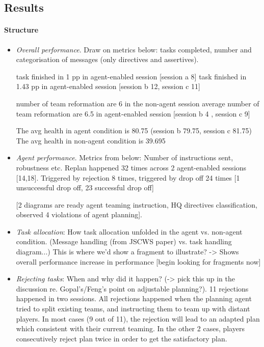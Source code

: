 \subsection{Results}

\paragraph{Structure}
\begin{itemize}
\item  \textit{Overall performance}. Draw on metrics below: tasks completed, number and categorisation of messages (only directives and assertives).


task finished in 1 pp in agent-enabled session [session a 8] 
task finished in 1.43 pp in agent-enabled session [session b 12, session c 11]

number of team reformation are 6 in the non-agent session 
average number of team reformation are 6.5 in agent-enabled session [session b 4 , session c 9]

The avg health in agent condition is 80.75 (session b 79.75, session c 81.75)
The avg health in non-agent condition is 39.695

\item \textit{Agent performance}. Metrics from below: Number of instructions sent, robustness etc. 
Replan happened 32 times across 2 agent-enabled sessions [14,18]. Triggered by rejection 8 times, triggered by drop off 24 times [1 unsuccessful drop off, 23 successful drop off]


[2 diagrams are ready agent teaming instruction, HQ directives classification, observed 4 violations of agent planning]. 

\item \textit{Task allocation}: How task allocation unfolded in the agent vs. non-agent condition. (Message handling (from JSCWS paper) vs. task handling diagram...) This is where we'd show a fragment to illustrate? -> Shows overall performance increase in performance
[begin looking for fragments now]


\item \textit{Rejecting tasks}: When and why did it happen? (-> pick this up in the discussion re. Gopal's/Feng's point on adjustable planning?). 
11 rejections happened in two sessions. All rejections happened when the planning agent tried to split existing teams, and instructing them to team up with distant players. In most cases (9 out of 11), the rejection will lead to an adapted plan which consistent with their current teaming. In the other 2 cases, players consecutively reject plan twice in order to get the satisfactory plan. 
 


\end{itemize}
